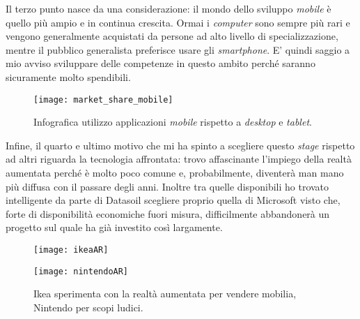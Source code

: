 Il terzo punto nasce da una considerazione: il mondo dello sviluppo \textit{mobile} è quello più ampio e in continua crescita. Ormai i \textit{computer} sono sempre più rari e vengono generalmente acquistati da persone ad alto livello di specializzazione, mentre il pubblico generalista preferisce usare gli \textit{smartphone}. E' quindi saggio a mio avviso sviluppare delle competenze in questo ambito perché saranno sicuramente molto spendibili.
\begin{figure}[H]
    \centering
    \texttt{[image: market\_share\_mobile]}
    \caption[\textit{Market share} \textit{desktop} e \textit{mobile}]{Infografica utilizzo applicazioni \textit{mobile} rispetto a \textit{desktop} e \textit{tablet}.\footnotemark}
\end{figure}
Infine, il quarto e ultimo motivo che mi ha spinto a scegliere questo \textit{stage} rispetto ad altri riguarda la tecnologia affrontata: trovo affascinante l'impiego della realtà aumentata perché è molto poco comune e, probabilmente, diventerà man mano più diffusa con il passare degli anni. Inoltre tra quelle disponibili ho trovato intelligente da parte di Datasoil scegliere proprio quella di Microsoft visto che, forte di disponibilità economiche fuori misura, difficilmente abbandonerà un progetto sul quale ha già investito così largamente.
\begin{figure}[H]
    \centering
    \begin{minipage}{.5\textwidth}
      \centering
      \texttt{[image: ikeaAR]}
      \label{fig:test1}
    \end{minipage}%
    \begin{minipage}{.5\textwidth}
      \centering
      \texttt{[image: nintendoAR]}
    \end{minipage}
    \caption[Ikea e Nintendo usano realtà aumentata]{Ikea sperimenta con la realtà aumentata per vendere mobilia, Nintendo per scopi ludici.\footnotemark}
\end{figure}

